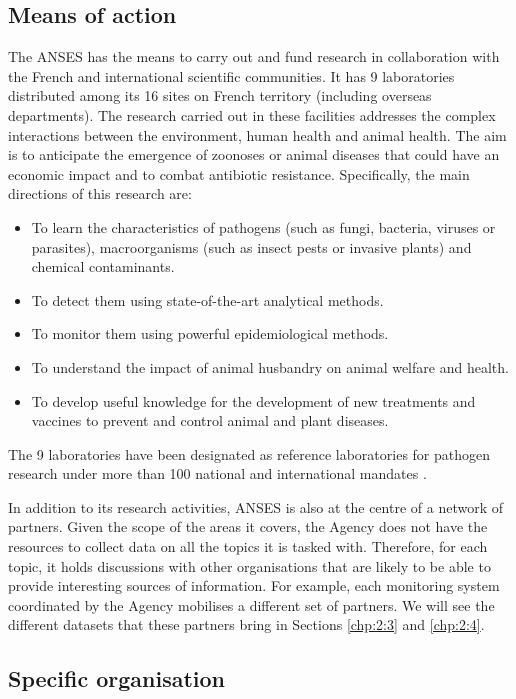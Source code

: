 \subsection{Means of action}

The ANSES has the means to carry out and fund research in collaboration with the French and international scientific communities. It has 9 laboratories distributed among its 16 sites on French territory (including overseas departments). The research carried out in these facilities addresses the complex interactions between the environment, human health and animal health. The aim is to anticipate the emergence of zoonoses or animal diseases that could have an economic impact and to combat antibiotic resistance. Specifically, the main directions of this research are:
\begin{itemize}
\item To learn the characteristics of pathogens (such as fungi, bacteria, viruses or parasites), macroorganisms (such as insect pests or invasive plants) and chemical contaminants. 
\item To detect them using state-of-the-art analytical methods.
\item To monitor them using powerful epidemiological methods.
\item To understand the impact of animal husbandry on animal welfare and health.
\item To develop useful knowledge for the development of new treatments and vaccines to prevent and control animal and plant diseases. 
\end{itemize} 
The 9 laboratories have been designated as reference laboratories for pathogen research under more than 100 national and international mandates \citep{ANSESLABS}.

In addition to its research activities, ANSES is also at the centre of a network of partners. Given the scope of the areas it covers, the Agency does not have the resources to collect data on all the topics it is tasked with. Therefore, for each topic, it holds discussions with other organisations that are likely to be able to provide interesting sources of information. For example, each monitoring system coordinated by the Agency mobilises a different set of partners. We will see the different datasets that these partners bring in Sections \ref{chp:2:3} and \ref{chp:2:4}.

\subsection{Specific organisation}

